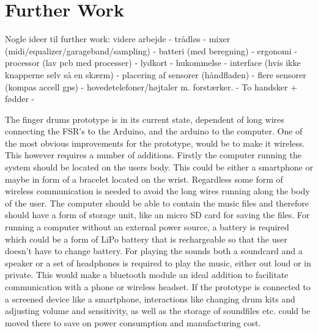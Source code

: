 \chapter{Further Work}
\label{further_work}
Nogle ideer til further work:
videre arbejde - trådløs - mixer (midi/equalizer/garageband/sampling) - batteri (med beregning) - ergonomi -  processor (lav pcb med processer) - lydkort - hukommelse - interface (hvis ikke knapperne selv så en skærm) - placering af sensorer (håndfladen) - flere sensorer (kompas accell gps) - hovedetelefoner/højtaler m. forstærker. - To handsker + fødder -    

The finger drums prototype is in its current state, dependent of long wires connecting the FSR's to the Arduino, and the arduino to the computer. One of the most obvious improvements for the prototype, would be to make it wireless. This however requires a number of additions. Firstly the computer running the system should be located on the users body. This could be either a smartphone or maybe in form of a bracelet located on the wrist. Regardless some form of wireless communication is needed to avoid the long wires running along the body of the user. The computer should be able to contain the music files and therefore should have a form of storage unit, like an micro SD card for saving the files. For running a computer without an external power source, a battery is required which could be a form of LiPo battery that is rechargeable so that the user doesn't have to change battery. For playing the sounds both a soundcard and a speaker or a set of headphones is required to play the music, either out loud or in private. This would make a bluetooth module an ideal addition to facilitate communication with a phone or wireless headset.
If the prototype is connected to a screened device like a smartphone, interactions like changing drum kits and adjusting volume and sensitivity, as well as the storage of soundfiles etc. could be moved there to save on power consumption and manufacturing cost.


